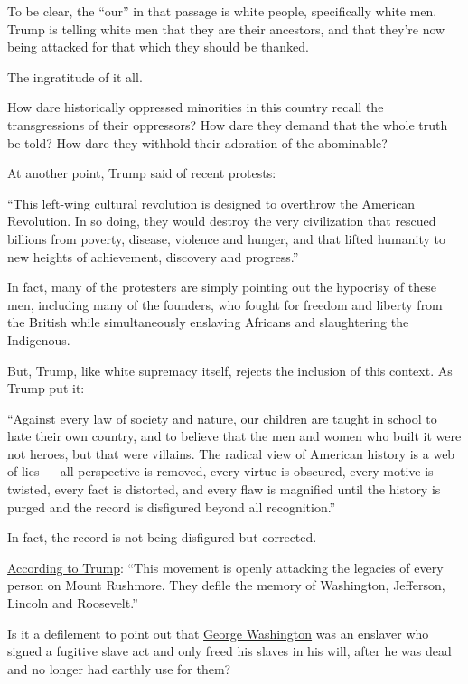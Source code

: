 To be clear, the ``our'' in that passage is white people, specifically
white men. Trump is telling white men that they are their ancestors, and
that they're now being attacked for that which they should be thanked.

The ingratitude of it all.

How dare historically oppressed minorities in this country recall the
transgressions of their oppressors? How dare they demand that the whole
truth be told? How dare they withhold their adoration of the abominable?

At another point, Trump said of recent protests:

``This left-wing cultural revolution is designed to overthrow the
American Revolution. In so doing, they would destroy the very
civilization that rescued billions from poverty, disease, violence and
hunger, and that lifted humanity to new heights of achievement,
discovery and progress.''

In fact, many of the protesters are simply pointing out the hypocrisy of
these men, including many of the founders, who fought for freedom and
liberty from the British while simultaneously enslaving Africans and
slaughtering the Indigenous.

But, Trump, like white supremacy itself, rejects the inclusion of this
context. As Trump put it:

``Against every law of society and nature, our children are taught in
school to hate their own country, and to believe that the men and women
who built it were not heroes, but that were villains. The radical view
of American history is a web of lies --- all perspective is removed,
every virtue is obscured, every motive is twisted, every fact is
distorted, and every flaw is magnified until the history is purged and
the record is disfigured beyond all recognition.''

In fact, the record is not being disfigured but corrected.

\href{https://www.whitehouse.gov/briefings-statements/remarks-president-trump-south-dakotas-2020-mount-rushmore-fireworks-celebration-keystone-south-dakota/}{According
to Trump}: ``This movement is openly attacking the legacies of every
person on Mount Rushmore. They defile the memory of Washington,
Jefferson, Lincoln and Roosevelt.''

Is it a defilement to point out that
\href{https://www.nytimes.com/2020/06/28/opinion/george-washington-confederate-statues.html}{George
Washington} was an enslaver who signed a fugitive slave act and only
freed his slaves in his will, after he was dead and no longer had
earthly use for them?

